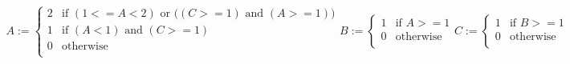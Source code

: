 \begin{center}




$
\begin{array}{cl}

A :=\left\{ \begin{array}{cl}
      2 & \mbox{if $(1 <= A < 2)$ or $((C >= 1)$ and $(A >= 1))$} \\
      1 & \mbox{if $(A < 1)$ and $(C >= 1)$} \\
      0 & \mbox{otherwise}  \\
     \end{array}
\right.
B :=\left\{ \begin{array}{cl}
      1 & \mbox{if $A >= 1$} \\
      0 & \mbox{otherwise}  \\
     \end{array}
\right.
C :=\left\{ \begin{array}{cl}
      1 & \mbox{if $B >= 1$} \\
      0 & \mbox{otherwise}  \\
     \end{array}
\right.
\end{array}
$

\end{center}

\bigskip




\bigskip
